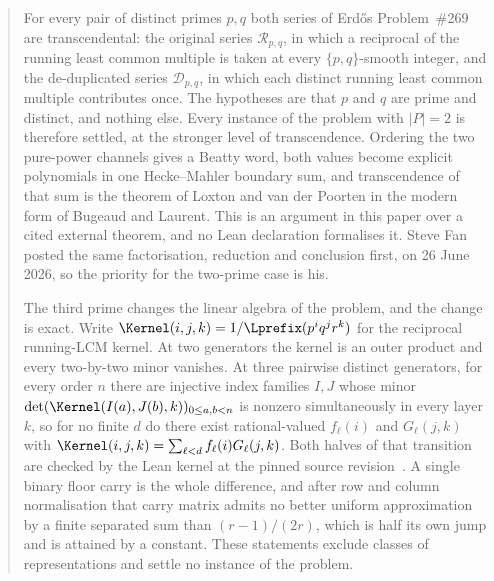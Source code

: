 \maketitle
\noteprovenance

\begin{abstract}
\noindent
For every pair of distinct primes \(p,q\) both series of Erd\H{o}s
Problem~\#269 are transcendental: the original series \(\mathcal R_{p,q}\), in
which a reciprocal of the running least common multiple is taken at every
\(\{p,q\}\)-smooth integer, and the de-duplicated series \(\mathcal D_{p,q}\),
in which each distinct running least common multiple contributes once.  The
hypotheses are that \(p\) and \(q\) are prime and distinct, and nothing else.
Every instance of the problem with \(|P|=2\) is therefore settled, at the
stronger level of transcendence.  Ordering the two pure-power channels gives a
Beatty word, both values become explicit polynomials in one Hecke--Mahler
boundary sum, and transcendence of that sum is the theorem of Loxton and van
der Poorten in the modern form of Bugeaud and Laurent.  This is an argument in
this paper over a cited external theorem, and no Lean declaration formalises
it.  Steve Fan posted the same factorisation, reduction and conclusion first,
on 26 June 2026, so the priority for the two-prime case is his.

The third prime changes the linear algebra of the problem, and the change is
exact.  Write \(\Kernel(i,j,k)=1/\Lprefix(p^{i}q^{j}r^{k})\) for the reciprocal
running-LCM kernel.  At two generators the kernel is an outer product and every
two-by-two minor vanishes.  At three pairwise distinct generators, for every
order \(n\) there are injective index families \(I,J\) whose minor
\(\det(\Kernel(I(a),J(b),k))_{0\le a,b<n}\) is nonzero simultaneously in every
layer \(k\), so for no finite \(d\) do there exist rational-valued
\(f_\ell(i)\) and \(G_\ell(j,k)\) with
\(\Kernel(i,j,k)=\sum_{\ell<d}f_\ell(i)G_\ell(j,k)\).  Both halves of that
transition are checked by the Lean kernel at the pinned source
revision~\commitshort.  A single binary floor carry is the whole difference,
and after row and column normalisation that carry matrix admits no better
uniform approximation by a finite separated sum than \((r-1)/(2r)\), which is
half its own jump and is attained by a constant.  These statements exclude
classes of representations and settle no instance of the problem.


\end{abstract}
